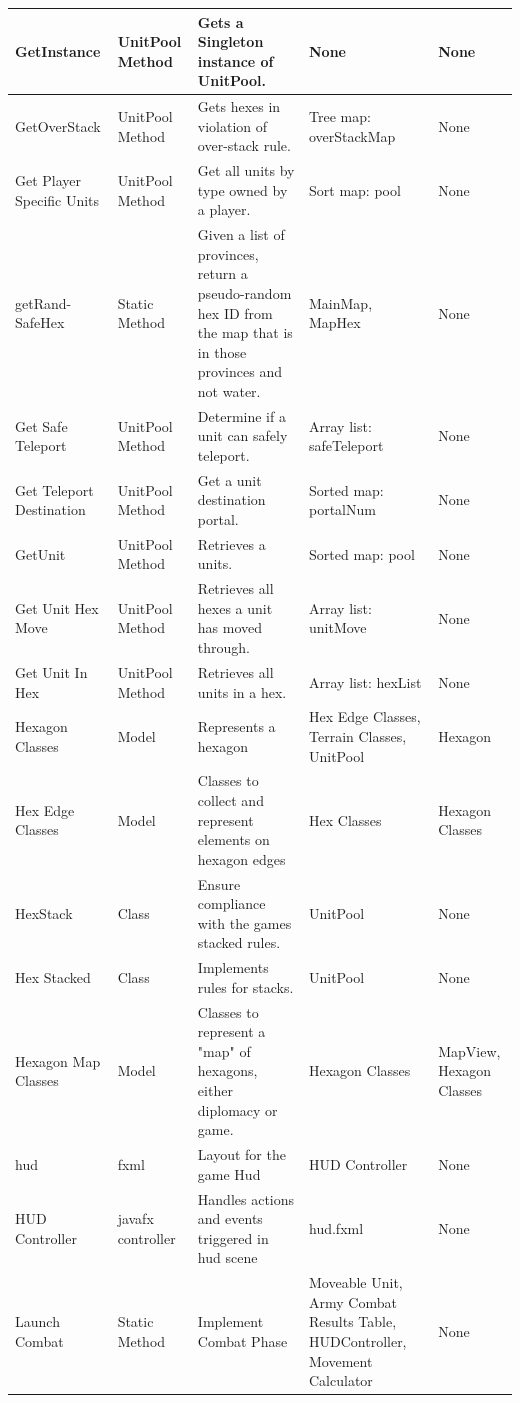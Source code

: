 \documentclass[12pt,a4paper,titlepage]{article}
\begin{document}
{\begin{center}
\begin{tabularx}{\linewidth}{|X|X|p{2in}|X|X|}
\hline
GetInstance & UnitPool Method & Gets a Singleton instance of UnitPool. & None & None\\
\hline
GetOverStack & UnitPool Method & Gets hexes in violation of over-stack rule. & Tree map: overStackMap & None\\
\hline
Get Player Specific Units & UnitPool Method & Get all units by type owned by a player. & Sort map: pool & None\\
\hline
getRand-SafeHex & Static Method & Given a list of provinces, return a pseudo-random hex ID from the map that is in those provinces and not water. & MainMap, MapHex & None \\
\hline
Get Safe Teleport & UnitPool Method & Determine if a unit can safely teleport. & Array list: safeTeleport & None\\
\hline
Get Teleport Destination & UnitPool Method & Get a unit destination portal. & Sorted map: portalNum & None\\
\hline
GetUnit & UnitPool Method & Retrieves a  units. & Sorted map: pool & None\\
\hline
Get Unit Hex Move & UnitPool Method & Retrieves all hexes a unit has moved through. & Array list: unitMove & None\\
\hline
Get Unit In Hex & UnitPool Method & Retrieves all units in a hex. & Array list: hexList & None\\
\hline
Hexagon Classes & Model & Represents a hexagon & Hex Edge Classes, Terrain Classes, UnitPool & Hexagon \\
\hline
Hex Edge Classes & Model & Classes to collect and represent elements on hexagon edges & Hex Classes & Hexagon Classes \\
\hline
HexStack & Class & Ensure compliance with the games stacked rules. & UnitPool & None\\
\hline
Hex Stacked & Class & Implements rules for stacks. & UnitPool & None\\
\hline
Hexagon Map Classes & Model & Classes to represent a "map" of hexagons, either diplomacy or game. & Hexagon Classes &
MapView, Hexagon Classes \\
\hline
hud & fxml & Layout for the game Hud & HUD Controller & None\\
\hline
HUD Controller & javafx controller & Handles actions and events triggered in hud scene & hud.fxml & None\\
\hline
Launch Combat & Static Method & Implement Combat Phase & Moveable Unit, Army Combat Results Table, HUDController, Movement Calculator & None\\

\end{tabularx}
\end{center}}
\end{document}
